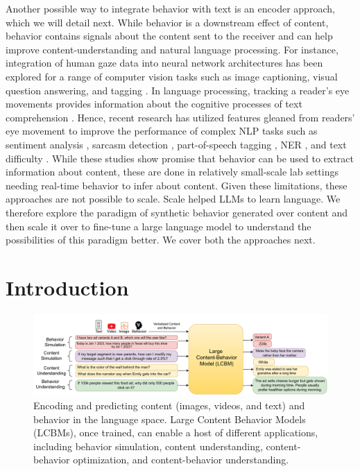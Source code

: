 Another possible way to integrate behavior with text is an encoder approach, which we will detail next. While behavior is a downstream effect of content, behavior contains signals about the content sent to the receiver and can help improve content-understanding and natural language processing. For instance,  integration of human gaze data into neural network architectures has been explored for a range of computer vision tasks such as image captioning, visual question answering, and tagging \cite{karessli2017gaze,yu2017supervising,he2019human,boyd2022human}. In language processing, tracking a reader's eye movements provides information about the cognitive processes of text comprehension \cite{RaynerReadingComp, Just1980}. Hence, recent research has utilized features gleaned from readers' eye movement to improve the performance of complex NLP tasks such as sentiment analysis \cite{long-etal-2017-cognition, mishra-etal-2016-leveraging}, sarcasm detection \cite{mishra-etal-2016-harnessing}, part-of-speech tagging \cite{barrett-etal-2016-cross}, NER \cite{hollenstein-zhang-2019-entity}, and text difficulty \cite{ScanPathApp1}. While these studies show promise that behavior can be used to extract information about content, these are done in relatively small-scale lab settings needing real-time behavior to infer about content. Given these limitations, these approaches are not possible to scale. Scale helped LLMs to learn language. We therefore explore the paradigm of synthetic behavior generated over content and then scale it over to fine-tune a large language model to understand the possibilities of this paradigm better. We cover both the approaches next.






\section{Introduction}
\label{ref:Introduction}

\begin{figure}[!ht]
    \centering
    \includegraphics[width=\textwidth]{images/fig1-lcbm.pdf}
    \caption{Encoding and predicting content (images, videos, and text) and behavior in the language space. Large Content Behavior Models (LCBMs), once trained, can enable a host of different applications, including behavior simulation, content understanding, content-behavior optimization, and content-behavior understanding.}
    \label{fig:figure-1-lcbm}
\end{figure}

